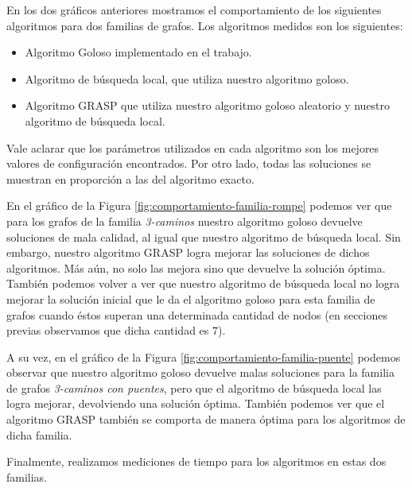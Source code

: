 En los dos gráficos anteriores mostramos el comportamiento de los siguientes algoritmos para dos familias de grafos. Los algoritmos medidos son los siguientes:

\begin{itemize}
 \item Algoritmo Goloso implementado en el trabajo.
 \item Algoritmo de búsqueda local, que utiliza nuestro algoritmo goloso.
 \item Algoritmo GRASP que utiliza nuestro algoritmo goloso aleatorio y nuestro algoritmo de búsqueda local.
\end{itemize}

Vale aclarar que los parámetros utilizados en cada algoritmo son los mejores valores de configuración encontrados. Por otro lado, todas las soluciones se muestran en proporción a las del algoritmo exacto.

En el gráfico de la Figura \ref{fig:comportamiento-familia-rompe} podemos ver que para los grafos de la familia \emph{3-caminos} nuestro algoritmo goloso devuelve soluciones de mala calidad, al igual que nuestro algoritmo de búsqueda local. Sin embargo, nuestro algoritmo GRASP logra mejorar las soluciones de dichos algoritmos. Más aún, no solo las mejora sino que devuelve la solución óptima. También podemos volver a ver que nuestro algoritmo de búsqueda local no logra mejorar la solución inicial que le da el algoritmo goloso para esta familia de grafos cuando éstos superan una determinada cantidad de nodos (en secciones previas observamos que dicha cantidad es $7$).

A su vez, en el gráfico de la Figura \ref{fig:comportamiento-familia-puente} podemos observar que nuestro algoritmo goloso devuelve malas soluciones para la familia de grafos \emph{3-caminos con puentes}, pero que el algoritmo de búsqueda local las logra mejorar, devolviendo una solución óptima. También podemos ver que el algoritmo GRASP también se comporta de manera óptima para los algoritmos de dicha familia.

Finalmente, realizamos mediciones de tiempo para los algoritmos en estas dos familias.

